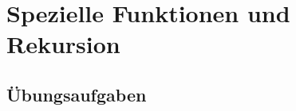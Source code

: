 %
%
%
\chapter{Spezielle Funktionen und Rekursion
\label{buch:chapter:rekursion}}
\rhead{}






\section*{Übungsaufgaben}
\begin{uebungsaufgaben}
\end{uebungsaufgaben}

